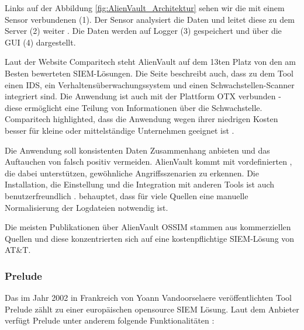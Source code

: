 
Links auf der Abbildung \ref{fig:AlienVault_Architektur} sehen wir die mit einem Sensor verbundenen  (1). Der Sensor analysiert die Daten und leitet diese zu dem Server (2) weiter \citep{AV_Sensor}. Die Daten werden auf Logger (3) gespeichert und über die \gls{GUI} (4) dargestellt.

Laut der Website Comparitech steht AlienVault auf dem 13ten Platz von den am Besten bewerteten \gls{SIEM}-Lösungen. Die Seite beschreibt auch, dass zu dem Tool einen \gls{IDS}, ein Verhaltensüberwachungssystem und einen Schwachstellen-Scanner integriert sind. Die Anwendung ist auch mit der Plattform \gls{OTX} verbunden - diese ermöglicht eine Teilung von Informationen über die Schwachstelle. Comparitech highlighted, dass die Anwendung wegen ihrer niedrigen Kosten besser für kleine oder mittelständige Unternehmen geeignet ist \citep{comparitech_SIEM}.

Die Anwendung soll konsistenten Daten Zusammenhang anbieten und das Auftauchen von \gls{falsch positiv} vermeiden. AlienVault kommt mit vordefinierten , die dabei unterstützen, gewöhnliche Angriffsszenarien zu erkennen. Die Installation, die Einstellung und die Integration mit anderen Tools ist auch benutzerfreundlich \citep{Gomes_AV}. \cite{Nabil_AV} behauptet, dass für viele Quellen eine manuelle Normalisierung der Logdateien notwendig ist.


Die meisten Publikationen über AlienVault OSSIM stammen aus kommerziellen Quellen und diese konzentrierten sich auf eine kostenpflichtige \gls{SIEM}-Lösung von AT\&T.

\subsubsection{Prelude}
Das im Jahr 2002 in Frankreich von Yoann Vandoorselaere veröffentlichten Tool Prelude zählt zu einer europäischen \gls{opensource} \gls{SIEM} Lösung. Laut dem Anbieter verfügt Prelude unter anderem folgende Funktionalitäten \citep{Prelude_SIEM}:

